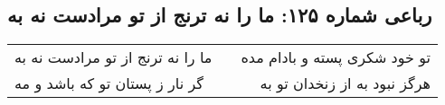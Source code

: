 \begin{center}
\section*{رباعی شماره ۱۲۵: ما را نه ترنج از تو مرادست نه به}
\label{sec:125}
\begin{longtable}{l p{0.5cm} r}
ما را نه ترنج از تو مرادست نه به
&&
تو خود شکری پسته و بادام مده
\\
گر نار ز پستان تو که باشد و مه
&&
هرگز نبود به از زنخدان تو به
\\
\end{longtable}
\end{center}
